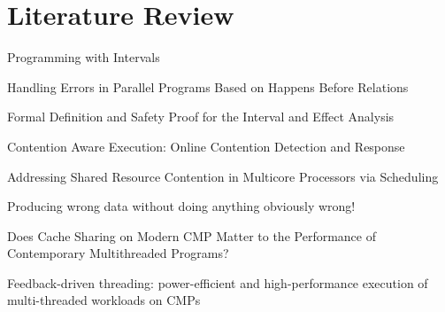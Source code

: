 
\chapter{Literature Review}
\label{cha:literature-review}

Programming with Intervals \cite{programmingwithintervalsmatsakis}

Handling Errors in Parallel Programs Based on Happens Before Relations
\cite{handlingerrorsmatsakis}

Formal Definition and Safety Proof for the Interval and Effect
Analysis \cite{formaldefinitionmatsakis}

Contention Aware Execution: Online Contention Detection and Response
\cite{mars10cgo}

Addressing Shared Resource Contention in Multicore Processors via
Scheduling \cite{sharedresourcecontentionfedorova}

Producing wrong data without doing anything obviously wrong!
\cite{1508275}

Does Cache Sharing on Modern CMP Matter to the Performance of
Contemporary Multithreaded Programs?
\cite{doescachesharingmatteratall}

Feedback-driven threading: power-efficient and high-performance
execution of multi-threaded workloads on CMPs \cite{1346317}